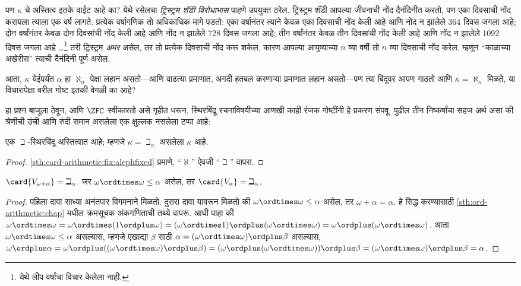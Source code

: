 पण $\kappa$ चे अस्तित्व इतके वाईट आहे का? येथे रसेलचा \emph{ट्रिस्ट्रम शॅंडी विरोधाभास} पाहणे उपयुक्त ठरेल. ट्रिस्ट्रम शॅंडी आपल्या जीवनाची नोंद दैनंदिनीत करतो, पण एका दिवसाची नोंद करायला त्याला एक वर्ष लागते. प्रत्येक वर्षागणिक तो अधिकाधिक मागे पडतो: एका वर्षानंतर त्याने केवळ एका दिवसाची नोंद केली आहे आणि नोंद न झालेले 364 दिवस जगला आहे; दोन वर्षांनंतर केवळ दोन दिवसांची नोंद केली आहे आणि नोंद न झालेले 728 दिवस जगला आहे; तीन वर्षांनंतर केवळ तीन दिवसांची नोंद केली आहे आणि नोंद न झालेले 1092 दिवस जगला आहे \dots\footnote{येथे लीप वर्षांचा विचार केलेला नाही.} तरी ट्रिस्ट्रम \emph{अमर} असेल, तर तो प्रत्येक दिवसाची नोंद करू शकेल, कारण आपल्या आयुष्याच्या $n$ व्या वर्षी तो $n$ व्या दिवसाची नोंद करेल. म्हणून “काळाच्या अखेरीस” त्याची दैनंदिनी पूर्ण असेल.

आता, $\kappa$ येईपर्यंत $\alpha$ हा $\aleph_\alpha$ पेक्षा लहान असतो---आणि वाढत्या प्रमाणात, अगदी हतबल करणाऱ्या प्रमाणात लहान असतो---पण त्या बिंदूवर आपण गाठतो आणि $\kappa
= \aleph_\kappa$ मिळते, या विचारापेक्षा वरील गोष्ट इतकी वेगळी का आहे?

हा प्रश्न बाजूला ठेवून, आणि $\ZFC$ स्वीकारतो असे गृहीत धरून, स्थिरबिंदू रचनांविषयीच्या आणखी काही रंजक गोष्टींनी हे प्रकरण संपवू. पुढील तीन निष्कर्षांचा सहज अर्थ असा की श्रेणीची उंची आणि रुंदी समान असलेला एक क्षुल्लक नसलेला टप्पा आहे:

\begin{prop}\label{sth:card-arithmetic:fix:bethfixed}
एक $\beth$-स्थिरबिंदू अस्तित्वात आहे; म्हणजे $\kappa=
\beth_\kappa$ असलेला $\kappa$ आहे.
\end{prop}

\begin{proof}
\ref{sth:card-arithmetic:fix:alephfixed} प्रमाणे, “$\aleph$” ऐवजी “$\beth$” वापरा.
\end{proof}

\begin{prop}\label{sth:card-arithmetic:fix:stagesize}
$\card{V_{\omega+\alpha}} = \beth_{\alpha}$. जर $\omega \ordtimes
\omega \leq \alpha$ असेल, तर $\card{V_\alpha} = \beth_\alpha$.
\end{prop}

\begin{proof}
पहिला दावा साध्या अनंतपार विगमनाने मिळतो. दुसरा दावा यावरून मिळतो की $\omega \ordtimes \omega \leq \alpha$ असेल, तर $\omega + \alpha = \alpha$. हे सिद्ध करण्यासाठी \ref{sth:ord-arithmetic:chap} मधील क्रमसूचक अंकगणिताची तथ्ये वापरू. आधी पाहा की $\omega \ordtimes \omega = \omega \ordtimes (1 \ordplus \omega) =
(\omega \ordtimes 1) \ordplus (\omega\ordtimes\omega) = \omega
\ordplus (\omega \ordtimes \omega)$. आता $\omega \ordtimes \omega
\leq \alpha$ असल्यास, म्हणजे एखाद्या $\beta$ साठी $\alpha = (\omega\ordtimes\omega) \ordplus \beta$ असल्यास, $\omega \ordplus \alpha = \omega \ordplus
((\omega \ordtimes \omega) \ordplus \beta) = (\omega \ordplus (\omega
\ordtimes \omega)) \ordplus \beta = (\omega \ordtimes \omega) \ordplus
\beta = \alpha$.
\end{proof}

